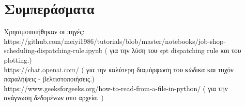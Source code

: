 \documentclass[paper=a4, fontsize=11pt]{scrartcl}
\numberwithin{equation}{section}		%
\numberwithin{figure}{section}			%
\numberwithin{table}{section}				%
\begin{document}
\section*{Συμπεράσματα}
Χρησιμοποιήθηκαν οι πηγές: \\
https://github.com/meiyi1986/tutorials/blob/master/notebooks/job-shop-scheduling-dispatching-rule.ipynb  ( για την λύση του spt dispatching rule και του plotting.) \\
https://chat.openai.com/  ( για την καλύτερη διαμόρφωση του κώδικα και τυχόν παραλήψεις - βελτιστοποιήσεις.) \\ 
https://www.geeksforgeeks.org/how-to-read-from-a-file-in-python/   ( για την ανάγνωση δεδομένων απο αρχεία. ) \\

\end{document}
